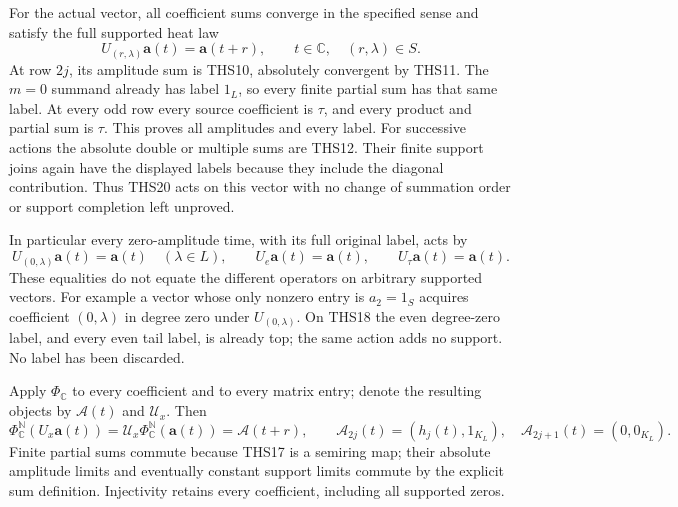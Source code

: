 \documentclass[11pt]{article}
\theoremstyle{definition}
\begin{document}
For the actual vector, all coefficient sums converge in the
specified sense and satisfy the full supported heat law
\begin{equation}\tag{THS21}
 U_{(r,\lambda)}\mathbf a(t)=\mathbf a(t+r),
 \qquad t\in\mathbb C,\quad(r,\lambda)\in S.
\end{equation}
At row $2j$, its amplitude sum is THS10, absolutely convergent
by THS11. The $m=0$ summand already has label $1_L$, so every
finite partial sum has that same label. At every odd row every
source coefficient is $\tau$, and every product and partial sum
is $\tau$. This proves all amplitudes and every label.
For successive actions the absolute double or multiple sums
are THS12. Their finite support joins again have the displayed
labels because they include the diagonal contribution. Thus
THS20 acts on this vector with no change of summation order or
support completion left unproved.

In particular every zero-amplitude time, with its full original
label, acts by
\begin{equation}\tag{THS22}
 U_{(0,\lambda)}\mathbf a(t)=\mathbf a(t)
 \quad(\lambda\in L),\qquad
 U_e\mathbf a(t)=\mathbf a(t),\qquad U_\tau\mathbf a(t)=\mathbf a(t).
\end{equation}
These equalities do not equate the different operators on
arbitrary supported vectors. For example a vector whose only
nonzero entry is $a_2=1_S$ acquires coefficient $(0,\lambda)$
in degree zero under $U_{(0,\lambda)}$. On THS18 the even
degree-zero label, and every even tail label, is already top;
the same action adds no support. No label has been discarded.

Apply $\Phi_{\mathbb C}$ to every coefficient and to every
matrix entry; denote the resulting objects by
$\boldsymbol{\mathcal A}(t)$ and $\mathcal U_x$. Then
\begin{equation}\tag{THS23}
 \Phi_{\mathbb C}^{\mathbb N}(U_x\mathbf a(t))
   =\mathcal U_x\Phi_{\mathbb C}^{\mathbb N}(\mathbf a(t))
   =\boldsymbol{\mathcal A}(t+r),\qquad
 \mathcal A_{2j}(t)=(h_j(t),1_{K_L}),\quad
 \mathcal A_{2j+1}(t)=(0,0_{K_L}).
\end{equation}
Finite partial sums commute because THS17 is a semiring map;
their absolute amplitude limits and eventually constant support
limits commute by the explicit sum definition. Injectivity
retains every coefficient, including all supported zeros.
\end{document}
